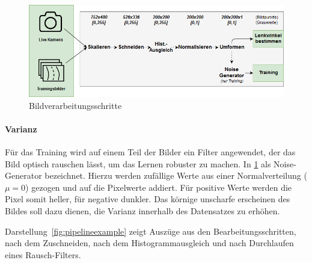 \begin{figure}[h]
	\centering
	\includegraphics[scale=0.56]{figures/Pipeline.png}
	\caption{Bildverarbeitungsschritte}
	\label{fig:dronetfrozen}
\end{figure}

\paragraph{Varianz}
Für das Training wird auf einem Teil der Bilder ein Filter angewendet, der das Bild optisch rauschen lässt, um das Lernen robuster zu machen. In \ref{fig:dronetfrozen} als Noise-Generator bezeichnet. Hierzu werden zufällige Werte aus einer Normalverteilung ($\mu = 0$) gezogen und auf die Pixelwerte addiert. Für positive Werte werden die Pixel somit heller, für negative dunkler. Das körnige unscharfe erscheinen des Bildes soll dazu dienen, die Varianz innerhalb des Datensatzes zu erhöhen.

Darstellung~\ref{fig:pipelineexample} zeigt Auszüge aus den Bearbeitungsschritten, nach dem Zuschneiden, nach dem Histogrammausgleich und nach Durchlaufen eines Rausch-Filters.

